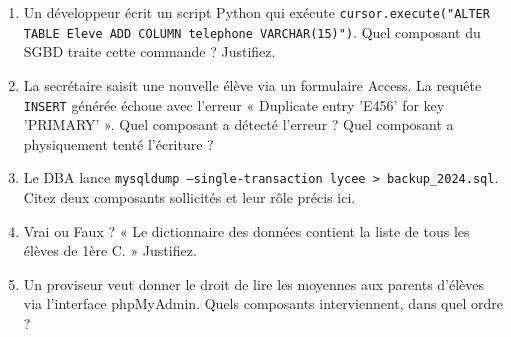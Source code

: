 \documentclass[11pt]{article}
\begin{document}
\begin{exercice}
\begin{enumerate}
    \item Un développeur écrit un script Python qui exécute \texttt{cursor.execute("ALTER TABLE Eleve ADD COLUMN telephone VARCHAR(15)")}. Quel composant du SGBD traite cette commande ? Justifiez.
    \item La secrétaire saisit une nouvelle élève via un formulaire Access. La requête \texttt{INSERT} générée échoue avec l'erreur « Duplicate entry 'E456' for key 'PRIMARY' ». Quel composant a détecté l'erreur ? Quel composant a physiquement tenté l'écriture ?
    \item Le DBA lance \texttt{mysqldump --single-transaction lycee > backup\_2024.sql}. Citez deux composants sollicités et leur rôle précis ici.
    \item Vrai ou Faux ? « Le dictionnaire des données contient la liste de tous les élèves de 1ère C. » Justifiez.
    \item Un proviseur veut donner le droit de lire les moyennes aux parents d'élèves via l'interface phpMyAdmin. Quels composants interviennent, dans quel ordre ?
\end{enumerate}
\end{exercice}
\end{document}
